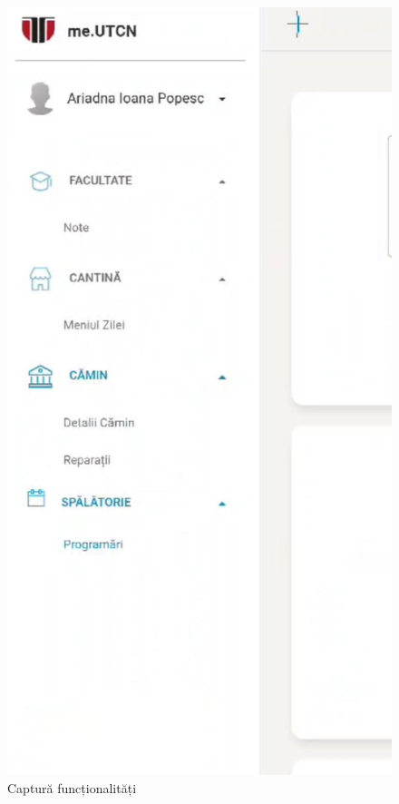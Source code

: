 \documentclass[12pt,a4paper]{report}
\theoremstyle{definition}
\theoremstyle{remark}
\begin{document}
\begin{figure}[H]
    \centering
    \begin{minipage}{.5\textwidth}
        \centering
        \includegraphics[width=.8\linewidth]{resurse/aplicatii_similare/utcn.png}
        \caption{Captură funcționalități}


\end{minipage}
\end{figure}
\end{document}
